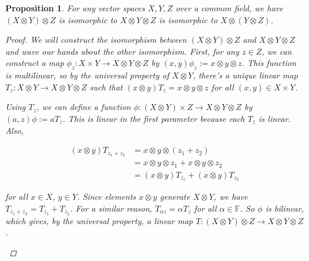 \documentclass[a4paper,14pt]{article}
\newtheorem*{prop}{Proposition}
\begin{document}
\begin{prop}
For any vector spaces $X, Y, Z$ over a common field, we have $(X \otimes Y) \otimes Z$ is isomorphic to $X \otimes Y \otimes Z$ is isomorphic to $X \otimes (Y \otimes Z)$.
\begin{proof}
    We will construct the isomorphism between $(X \otimes Y) \otimes Z$ and $X \otimes Y \otimes Z$ and wave our hands about the other isomorphism. First, for any $z \in Z$, we can construct a map $\phi_z: X \times Y \to X \otimes Y \otimes Z$ by $(x, y) \phi_z := x \otimes y \otimes z$. This function is multilinear, so by the universal property of $X \otimes Y$, there's a unique linear map $T_z: X \otimes Y \to X \otimes Y \otimes Z$ such that $(x \otimes y ) T_z = x \otimes y \otimes z$ for all $(x, y) \in X \times Y$.

\begin{center}
\end{center}

Using $T_z$, we can define a function $\phi: (X \otimes Y) \times Z \to X \otimes Y \otimes Z$ by $(a, z) \phi := a T_z$. This is linear in the first parameter because each $T_z$ is linear. Also, 

\begin{align*}
(x \otimes y) T_{z_1 + z_2} & = x \otimes y \otimes (z_1 + z_2) \\
                            & = x \otimes y \otimes z_1 + x \otimes y \otimes z_2 \\
                            & = (x \otimes y) T_{z_1} + (x \otimes y) T_{z_2}
\end{align*}
    
for all $x \in X$, $y \in Y$. Since elements $x \otimes y$ generate $X \otimes Y$, we have $T_{z_1 + z_2} = T_{z_1} + T_{z_2}$. For a similar reason, $T_{\alpha z} = \alpha T_z$ for all $\alpha \in \mathbb{F}$. So $\phi$ is bilinear, which gives, by the universal property, a linear map $T: (X \otimes Y) \otimes Z \to X \otimes Y \otimes Z$.

\begin{center}
\end{center}


\end{proof}
\end{prop}
\end{document}
